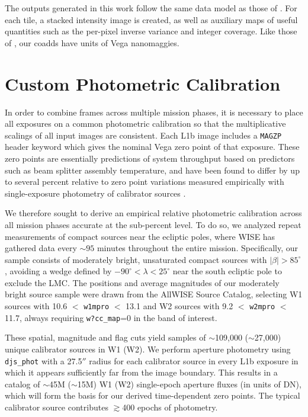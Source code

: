 \documentclass{emulateapj}
\begin{document}
The outputs generated in this work follow the same data model as those of 
\cite{lang14}. For each tile, a stacked intensity image is created, as well as
auxiliary maps of useful quantities such as the per-pixel inverse variance and
integer coverage. Like those of \cite{lang14}, our coadds have units of Vega 
nanomaggies.

\section{Custom Photometric Calibration}
\label{sec:calib}

In order to combine frames across multiple mission phases, it is necessary
to place all exposures on a common photometric calibration so that
the multiplicative scalings of all input images are consistent. Each L1b
image includes a \verb|MAGZP| header keyword which gives the nominal
Vega zero point of that exposure. These zero points are essentially
predictions of system throughput based on predictors such as beam splitter
assembly temperature, and have been found to differ by up to several percent 
relative to zero point variations measured empirically with single-exposure
photometry of calibrator sources \citep[e.g.][$\S$V.3.a.iii.1]{cutri13}.

We therefore sought to derive an empirical relative photometric calibration
across all mission phases accurate at the sub-percent level. To do so, we 
analyzed repeat measurements of compact sources near the 
ecliptic poles, where WISE has gathered data every $\sim$$95$ minutes 
throughout the entire mission. Specifically, our sample consists of moderately 
bright, unsaturated compact sources with $|\beta| > 85^{\circ}$, avoiding a 
wedge defined by $-90^{\circ}$$<$$\lambda$$<25^{\circ}$ near the south ecliptic
pole to exclude the LMC. The positions and average magnitudes of our 
moderately bright source sample were drawn from the AllWISE Source Catalog, 
selecting W1 sources with 10.6 $<$ \verb|w1mpro| $<$ 13.1 and W2 sources
with 9.2 $<$ \verb|w2mpro| $<$ 11.7, always requiring \verb|w?cc_map|=0 in the 
band of interest.

These spatial, magnitude and flag cuts yield samples of $\sim$109,000 
($\sim$27,000) unique calibrator sources in W1 (W2). We perform aperture 
photometry using \verb|djs_phot| with a 27.5$''$ radius for each calibrator 
source in every L1b exposure in which it appears sufficiently far from the 
image boundary. This results in a catalog of $\sim$45M ($\sim$15M) W1 (W2) 
single-epoch aperture fluxes (in units of DN), which will form the basis for 
our derived time-dependent zero points. The typical calibrator source 
contributes $\gtrsim$400 epochs of photometry.
\end{document}
